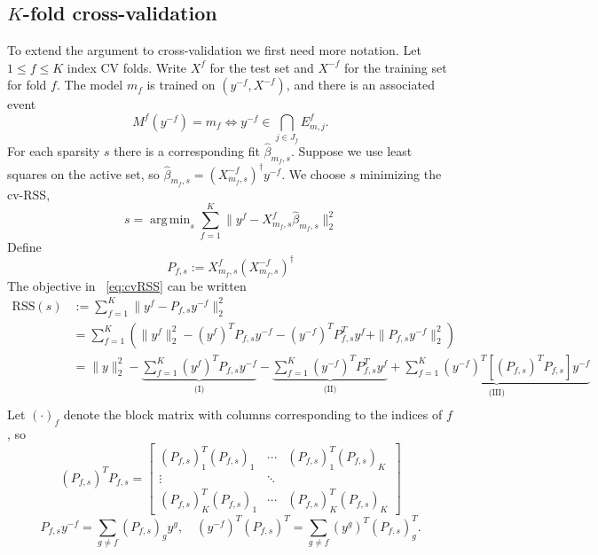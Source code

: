 \documentclass[preprint]{imsart}
\DeclareMathOperator*{\argmin}{arg\,min}
\begin{document}
\subsection{$K$-fold cross-validation}
\label{sec:kfoldcv}
To extend the argument to cross-validation we first need more
notation. Let $1 \leq f \leq K$ index CV folds. Write $X^f$ for the
test set and $X^{-f}$ for the training set for fold $f$. The
model $m_f$ is trained on $(y^{-f}, X^{-f})$, and there is an
associated event 
\begin{equation}
  \label{eq:cvmodel}
  M^{f}(y^{-f}) = m_f \iff y^{-f} \in \bigcap_{j \in J_f} E^f_{m,j}.
\end{equation}
For each sparsity $s$
there is a corresponding fit $\hat \beta_{m_f,s}$. Suppose we use
least squares on the active set, so $\hat \beta_{m_f,s} =
(X^{-f}_{m_f,s})^\dagger y^{-f}$. 
We choose $s$ minimizing the cv-RSS, 
\begin{equation}
  \label{eq:cvRSS}
  s = \argmin_s \sum_{f=1}^K \| y^{f} - X^{f}_{m_f,s} \hat \beta_{m_f,s} \|_2^2
\end{equation}
Define
\begin{equation}
  \label{eq:cvproj}
  P_{f,s} := X^{f}_{m_f,s} (X^{-f}_{m_f,s})^\dagger
\end{equation}
The objective in ~\eqref{eq:cvRSS} can be written
\begin{equation}
  \label{eq:cvRSSexpanded}
  \begin{aligned}
    \text{RSS}(s) &:= \sum_{f=1}^K \| y^f - P_{f,s} y^{-f} \|_2^2 \\
    &= \sum_{f=1}^K \left( \| y^f \|_2^2 - (y^f)^TP_{f,s}y^{-f} - (y^{-f})^T P_{f,s}^T y^f + \| P_{f,s} y^{-f} \|_2^2 \right) \\
    &= \| y \|_2^2 - \underbrace{\sum_{f=1}^K (y^f)^TP_{f,s}y^{-f}}_\text{(I)} - \underbrace{\sum_{f=1}^K (y^{-f})^T P_{f,s}^T y^f}_\text{(II)} + \underbrace{\sum_{f=1}^K (y^{-f})^T[(P_{f,s})^TP_{f,s}]y^{-f}}_\text{(III)} \\
   \end{aligned}
\end{equation}
Let $(\cdot)_f$ denote the block matrix with columns corresponding to
the indices of $f$, so 
\begin{equation}
  \label{eq:cvblocks1}
  (P_{f,s})^TP_{f,s} =
  \begin{bmatrix}
    (P_{f,s})^T_1(P_{f,s})_1 & \cdots & (P_{f,s})^T_1(P_{f,s})_K \\
    \vdots & \ddots & \\
    (P_{f,s})^T_K(P_{f,s})_1 & \cdots & (P_{f,s})^T_K(P_{f,s})_K
  \end{bmatrix}
\end{equation}
\begin{equation}
  \label{eq:cvblocks2}
  P_{f,s}y^{-f} = \sum_{g \neq f} (P_{f,s})_g y^g, \quad
  (y^{-f})^T (P_{f,s})^T = \sum_{g \neq f} (y^g)^T (P_{f,s})_g^T.
\end{equation}
\end{document}
